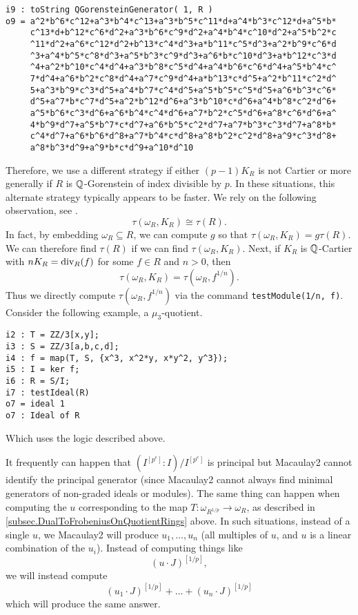 \documentclass{amsart}
\begin{document}
\medskip
\begin{verbatim}
i9 : toString QGorensteinGenerator( 1, R )
o9 = a^2*b^6*c^12+a^3*b^4*c^13+a^3*b^5*c^11*d+a^4*b^3*c^12*d+a^5*b*
     c^13*d+b^12*c^6*d^2+a^3*b^6*c^9*d^2+a^4*b^4*c^10*d^2+a^5*b^2*c
     ^11*d^2+a^6*c^12*d^2+b^13*c^4*d^3+a*b^11*c^5*d^3+a^2*b^9*c^6*d
     ^3+a^4*b^5*c^8*d^3+a^5*b^3*c^9*d^3+a^6*b*c^10*d^3+a*b^12*c^3*d
     ^4+a^2*b^10*c^4*d^4+a^3*b^8*c^5*d^4+a^4*b^6*c^6*d^4+a^5*b^4*c^
     7*d^4+a^6*b^2*c^8*d^4+a^7*c^9*d^4+a*b^13*c*d^5+a^2*b^11*c^2*d^
     5+a^3*b^9*c^3*d^5+a^4*b^7*c^4*d^5+a^5*b^5*c^5*d^5+a^6*b^3*c^6*
     d^5+a^7*b*c^7*d^5+a^2*b^12*d^6+a^3*b^10*c*d^6+a^4*b^8*c^2*d^6+
     a^5*b^6*c^3*d^6+a^6*b^4*c^4*d^6+a^7*b^2*c^5*d^6+a^8*c^6*d^6+a^
     4*b^9*d^7+a^5*b^7*c*d^7+a^6*b^5*c^2*d^7+a^7*b^3*c^3*d^7+a^8*b*
     c^4*d^7+a^6*b^6*d^8+a^7*b^4*c*d^8+a^8*b^2*c^2*d^8+a^9*c^3*d^8+
     a^8*b^3*d^9+a^9*b*c*d^9+a^10*d^10
\end{verbatim}
\medskip

Therefore, we use a different strategy if either $(p-1)K_R$ is not Cartier or more generally if $R$ is $\mathbb{Q}$-Gorenstein of index divisible by $p$.   In these situations, this alternate strategy typically appears to be faster.  We rely on the following observation, see \cite{BlickleSchwedeTuckerTestAlterations}.
\[
\tau(\omega_R, K_R) \cong \tau(R).
\]
In fact, by embedding $\omega_R \subseteq R$, we can compute $g$ so that $\tau(\omega_R, K_R) = g \tau(R)$.  We can therefore find $\tau(R)$ if we can find $\tau(\omega_R, K_R)$.
Next, if $K_R$ is $\mathbb{Q}$-Cartier with $nK_R = \operatorname{{div}}_R(f)$ for some $f \in R$ and $n > 0$, then
\[
\tau(\omega_R, K_R) =\tau(\omega_R, f^{1/n}).
\]
Thus we directly compute $\tau(\omega_R, f^{1/n})$ via the command \texttt{testModule(1/n, f)}.  Consider the following example, a $\mu_3$-quotient.

\medskip
\begin{verbatim}
i2 : T = ZZ/3[x,y];
i3 : S = ZZ/3[a,b,c,d];
i4 : f = map(T, S, {x^3, x^2*y, x*y^2, y^3});
i5 : I = ker f;
i6 : R = S/I;
i7 : testIdeal(R)
o7 = ideal 1
o7 : Ideal of R
\end{verbatim}
\medskip

Which uses the logic described above.

\begin{remark}
It frequently can happen that $(I^{[p^e]} : I)/I^{[p^e]}$ is principal but Macaulay2 cannot identify the principal generator (since Macaulay2 cannot always find minimal generators of non-graded ideals or modules).  The same thing can happen when computing the $u$ corresponding to the map $T : \omega_{R^{1/p}} \to \omega_R$, as described in \autoref{subsec.DualToFrobeniusOnQuotientRings} above.  In such situations, instead of a single $u$, we Macaulay2 will produce $u_1, \dots, u_n$ (all multiples of $u$, and $u$ is a linear combination of the $u_i$).  Instead of computing things like
\[
(u \cdot J)^{[1/p]},
\]
we will instead compute
\[
(u_1 \cdot J)^{[1/p]} + \dots + (u_n \cdot J)^{[1/p]}
\]
which will produce the same answer.
\end{remark}
\end{document}
